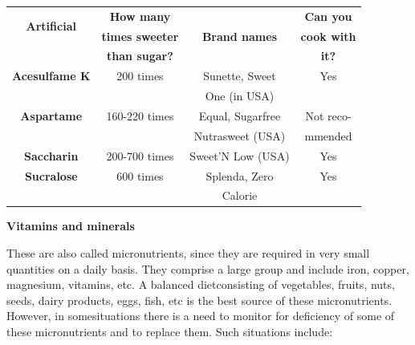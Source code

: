 {
\addtolength{\tabcolsep}{-5pt}
\begin{longtable}{|c|c|c|c|}
\hline
\multicolumn{1}{|c|}{\multirow{2}{1.6cm}{\textbf{Artificial}}} & \textbf{How many} &  & \textbf{Can you}\\
\multicolumn{1}{|c|}{\multirow{2}{1.6cm}{\textbf{Sweetener}}} & \textbf{times sweeter} & \textbf{Brand names} & \textbf{cook with}\\
 & \textbf{than sugar?} &  & \textbf{it?}\\
\hline
\textbf{Acesulfame K} & 200 times & Sunette, Sweet & Yes\\
 &  & One (in USA) & \\
\hline
\textbf{Aspartame} & 160-220 times & Equal, Sugarfree & Not reco-\\
 &  & Nutrasweet (USA) & mmended\\
\hline
\textbf{Saccharin} & 200-700 times & Sweet’N Low (USA) & Yes\\
\hline
\textbf{Sucralose} & 600 times & Splenda, Zero & Yes\\
 &  & Calorie & \\
\hline
\end{longtable}
}\relax

\noindent\textbf{Vitamins and minerals}

These are also called micronutrients, since they are required in very small quantities on a daily basis. They comprise a large group and include iron, copper, magnesium, vitamins, etc. A balanced diet\break consisting of vegetables, fruits, nuts, seeds, dairy products, eggs, fish, etc is the best source of these micronutrients. However, in some\break situations there is a need to monitor for deficiency of some of these micronutrients and to replace them. Such situations include:


